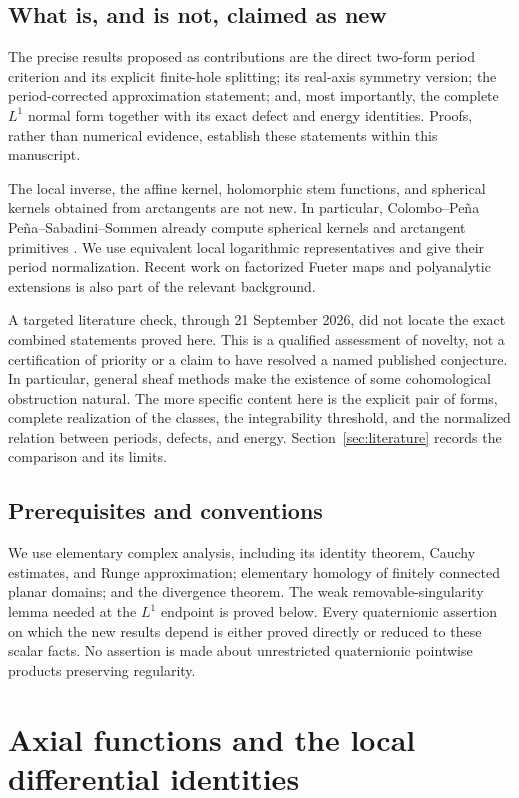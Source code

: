 \documentclass[11pt,a4paper]{article}
\numberwithin{equation}{section}
\theoremstyle{definition}
\theoremstyle{remark}
\begin{document}
\subsection{What is, and is not, claimed as new}
The precise results proposed as contributions are the direct two-form period
criterion and its explicit finite-hole splitting; its real-axis symmetry
version; the period-corrected approximation statement; and, most importantly,
the complete $L^1$ normal form together with its exact defect and energy
identities. Proofs, rather than numerical evidence, establish these statements
within this manuscript.

The local inverse, the affine kernel, holomorphic stem functions, and
spherical kernels obtained from arctangents are not new. In particular,
Colombo--Pe\~na Pe\~na--Sabadini--Sommen already compute spherical kernels and
arctangent primitives \cite[Example 2]{CPSS}. We use equivalent local
logarithmic representatives and give their period normalization. Recent work
on factorized Fueter maps and polyanalytic extensions \cite{DP2026} is also
part of the relevant background.

A targeted literature check, through 21 September 2026, did not locate the
exact combined statements proved here. This is a qualified assessment of
novelty, not a certification of priority or a claim to have resolved a named
published conjecture. In particular, general sheaf methods make the existence
of some cohomological obstruction natural. The more specific content here is
the explicit pair of forms, complete realization of the classes, the
integrability threshold, and the normalized relation between periods, defects,
and energy. Section~\ref{sec:literature} records the comparison and its limits.

\subsection{Prerequisites and conventions}
We use elementary complex analysis, including its identity theorem, Cauchy
estimates, and Runge approximation; elementary homology of finitely connected
planar domains; and the divergence theorem. The weak removable-singularity
lemma needed at the $L^1$ endpoint is proved below. Every quaternionic
assertion on which the new results depend is either proved directly or reduced
to these scalar facts. No assertion is made about unrestricted quaternionic
pointwise products preserving regularity.

\section{Axial functions and the local differential identities}
\label{sec:prelim}
\end{document}
